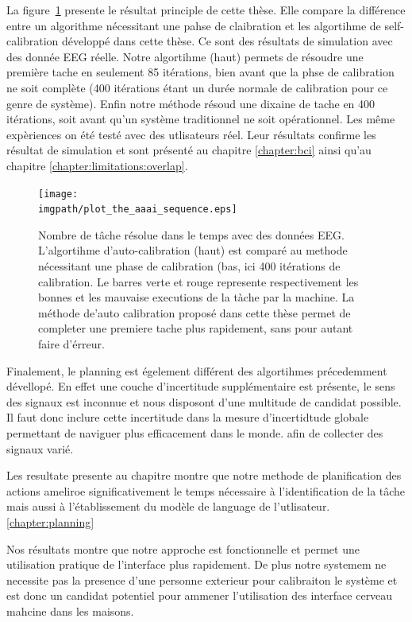 La figure~\ref{fig:sequencefrench} presente le résultat principle de cette thèse. Elle compare la différence entre un algorithme nécessitant une pahse de claibration et les algortihme de self-calibration développé dans cette thèse.  Ce sont des résultats de simulation avec des donnée EEG réelle. Notre algortihme (haut) permets de résoudre une première tache en seulement 85 itérations, bien avant que la phse de calibration ne soit complète (400 itérations étant un durée normale de calibration pour ce genre de système).
Enfin notre méthode résoud une dixaine de tache en 400 itérations, soit avant qu'un système traditionnel ne soit opérationnel. Les même expèriences on été testé avec des utlisateurs réel. Leur résultats confirme les résultat de simulation et sont présenté au chapitre \ref{chapter:bci} ainsi qu'au chapitre \ref{chapter:limitations:overlap}.

\begin{figure}[!htbp]
\centering
\texttt{[image: \\imgpath/plot\_the\_aaai\_sequence.eps]}
\caption{Nombre de tâche résolue dans le temps avec des données EEG. L'algortihme d'auto-calibration (haut) est comparé au methode nécessitant une phase de calibration (bas, ici 400 itérations de calibration. Le barres verte et rouge represente respectivement les bonnes et les mauvaise executions de la tàche par la machine. La méthode de'auto calibration proposé dans cette thèse permet de completer une premiere tache plus rapidement, sans pour autant faire d'érreur.}
\label{fig:sequencefrench}
\end{figure}

Finalement, le planning est égelement différent des algortihmes précedemment dévellopé. En effet une couche d'incertitude supplémentaire est présente, le sens des signaux est inconnue et nous disposont d'une multitude de candidat possible. Il faut donc inclure cette incertitude dans la mesure d'incertidtude globale permettant de naviguer plus efficacement dans le monde. afin de collecter des signaux varié.

Les resultate presente au chapitre montre que notre methode de planification des actions ameliroe significativement le temps nécessaire à l'identification de la tâche mais aussi à l'établissement du modèle de language de l'utlisateur.
\ref{chapter:planning}

Nos résultats montre que notre approche est fonctionnelle et permet une utilisation pratique de l'interface plus rapidement. De plus notre systemem ne necessite pas la presence d'une personne exterieur pour calibraiton le système et est donc un candidat potentiel pour ammener l'utilisation des interface cerveau mahcine dans les maisons.


